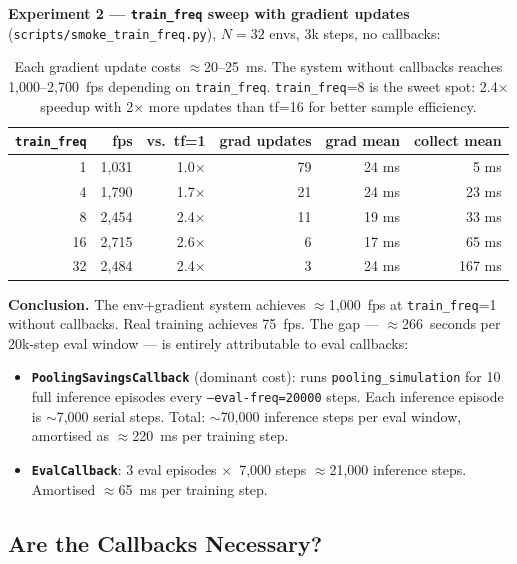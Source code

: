 \documentclass[11pt]{article}
\begin{document}
\textbf{Experiment 2 — \texttt{train\_freq} sweep with gradient updates}
(\texttt{scripts/smoke\_train\_freq.py}), $N=32$ envs, 3k steps, no callbacks:

\begin{table}[h]
\centering
\begin{tabular}{rrrrrr}
\toprule
\texttt{train\_freq} & fps & vs.\ tf=1 & grad updates & grad mean & collect mean \\
\midrule
 1 & 1,031 & 1.0$\times$ & 79 & 24 ms & ~5 ms \\
 4 & 1,790 & 1.7$\times$ & 21 & 24 ms & 23 ms \\
 8 & 2,454 & 2.4$\times$ & 11 & 19 ms & 33 ms \\
16 & 2,715 & 2.6$\times$ &  6 & 17 ms & 65 ms \\
32 & 2,484 & 2.4$\times$ &  3 & 24 ms & 167 ms \\
\bottomrule
\end{tabular}
\caption{Each gradient update costs $\approx$20--25~ms. The system
without callbacks reaches 1,000--2,700~fps depending on \texttt{train\_freq}.
\texttt{train\_freq}=8 is the sweet spot: 2.4$\times$ speedup with 2$\times$
more updates than tf=16 for better sample efficiency.}
\end{table}

\textbf{Conclusion.} The env+gradient system achieves
$\approx$1,000~fps at \texttt{train\_freq}=1 without callbacks.
Real training achieves 75~fps.
The gap — $\approx$266~seconds per 20k-step eval window — is entirely
attributable to eval callbacks:

\begin{itemize}
  \item \textbf{\texttt{PoolingSavingsCallback}} (dominant cost): runs
        \texttt{pooling\_simulation} for 10 full inference episodes every
        \texttt{--eval-freq=20000} steps. Each inference episode is
        $\sim$7,000 serial steps. Total: $\sim$70,000 inference steps
        per eval window, amortised as $\approx$220~ms per training step.
  \item \textbf{\texttt{EvalCallback}}: 3 eval episodes $\times$~7,000 steps
        $\approx$21,000 inference steps. Amortised $\approx$65~ms per
        training step.
\end{itemize}

\subsection{Are the Callbacks Necessary?}
\end{document}
